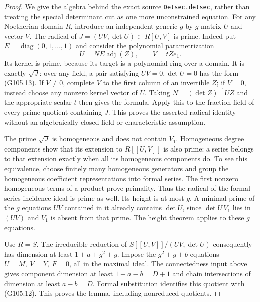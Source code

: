 \begin{proof}
We give the algebra behind the exact source
\texttt{Detsec.detsec}, rather than treating the special
determinant cut as one more unconstrained equation.
For any Noetherian domain \(R\), introduce an independent
generic \(g\)-by-\(g\) matrix \(U\) and vector \(V\).
The radical of
\(J=(UV,\det U)\subset R[U,V]\) is prime.
Indeed put \(E=\operatorname{diag}(0,1,\ldots,1)\) and
consider the polynomial parametrization
\[
                  U=N E\operatorname{adj}(Z),
                  \qquad V=tZe_1.
 \tag{G105.13}
\]
Its kernel is prime, because its target is a polynomial
ring over a domain.  It is exactly \(\sqrt J\): over any
field, a pair satisfying \(UV=0,\det U=0\) has the
form (G105.13).  If \(V\ne0\), complete \(V\) to the
first column of an invertible \(Z\); if \(V=0\), instead
choose any nonzero kernel vector of \(U\).  Taking
\(N=(\det Z)^{-1}UZ\) and the appropriate scalar \(t\)
then gives the formula.  Apply this to the fraction field
of every prime quotient containing \(J\).  This proves
the asserted radical identity without an algebraically
closed-field or characteristic assumption.

The prime \(\sqrt J\) is homogeneous and does not contain
\(V_1\).  Homogeneous degree components show that its
extension to \(R[[U,V]]\) is also prime: a series belongs
to that extension exactly when all its homogeneous
components do.  To see this equivalence, choose finitely
many homogeneous generators and group the homogeneous
coefficient representations into formal series.  The
first nonzero homogeneous terms of a product prove
primality.  Thus the radical of the formal-series
incidence ideal is prime as well.  Its height is at most
\(g\).  A minimal prime of the \(g\) equations \(UV\)
contained in it already contains \(\det U\), since
\(\det U\,V_1\) lies in \((UV)\) and \(V_1\) is absent
from that prime.  The height theorem applies to these
\(g\) equations.

Use \(R=S\).  The irreducible reduction of
\(S[[U,V]]/(UV,\det U)\) consequently has dimension at
least \(1+a+g^2+g\).  Impose the \(g^2+g+b\) equations
\(U=M,\ V=Y,\ F=0\), all in the maximal ideal.
The connectedness input above gives component dimension
at least \(1+a-b=D+1\) and chain intersections of
dimension at least \(a-b=D\).  Formal substitution
identifies this quotient with (G105.12).
This proves the lemma, including nonreduced quotients.
\end{proof}


